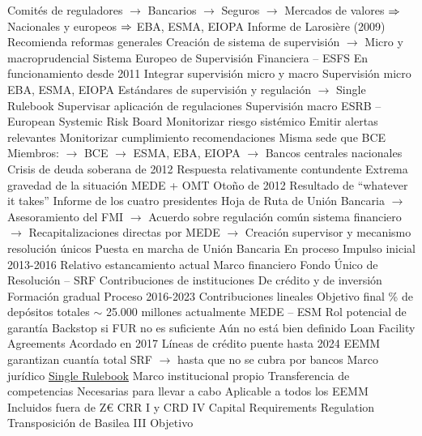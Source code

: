 \documentclass{nuevotema}
\begin{document}
\begin{esquemal}
				\4[] Comités de reguladores
				\4[] $\to$ Bancarios
				\4[] $\to$ Seguros
				\4[] $\to$ Mercados de valores
				\4[] $\Rightarrow$ Nacionales y europeos
				\4[] $\Rightarrow$ EBA, ESMA, EIOPA
			\3 Informe de Larosière (2009)
				\4 Recomienda reformas generales
				\4 Creación de sistema de supervisión
				\4[] $\to$ Micro y macroprudencial
			\3 Sistema Europeo de Supervisión Financiera -- ESFS
				\4 En funcionamiento desde 2011
				\4 Integrar supervisión micro y macro
				\4 Supervisión micro
				\4[] EBA, ESMA, EIOPA
				\4[] Estándares de supervisión y regulación
				\4[] $\to$ Single Rulebook
				\4[] Supervisar aplicación de regulaciones
				\4 Supervisión macro
				\4[] ESRB -- European Systemic Risk Board
				\4[] Monitorizar riesgo sistémico
				\4[] Emitir alertas relevantes
				\4[] Monitorizar cumplimiento recomendaciones
				\4[] Misma sede que BCE
				\4[] Miembros:
				\4[] $\to$ BCE
				\4[] $\to$ ESMA, EBA, EIOPA
				\4[] $\to$ Bancos centrales nacionales
			\3 Crisis de deuda soberana de 2012
				\4 Respuesta relativamente contundente
				\4[] Extrema gravedad de la situación
				\4 MEDE + OMT
				\4[] Otoño de 2012
				\4[] Resultado de ``whatever it takes''
				\4 Informe de los cuatro presidentes
				\4[] Hoja de Ruta de Unión Bancaria
				\4[] $\to$ Asesoramiento del FMI
				\4[] $\to$ Acuerdo sobre regulación común sistema financiero
				\4[] $\to$ Recapitalizaciones directas por MEDE
				\4[] $\to$ Creación supervisor y mecanismo resolución únicos
			\3 Puesta en marcha de Unión Bancaria
				\4 En proceso
				\4 Impulso inicial 2013-2016
				\4 Relativo estancamiento actual
		\2 Marco financiero
			\3 Fondo Único de Resolución -- SRF
				\4 Contribuciones de instituciones
				\4[] De crédito y de inversión
				\4 Formación gradual
				\4[] Proceso 2016-2023
				\4[] Contribuciones lineales
				\4 Objetivo final
				\% de depósitos totales
				\4[] $\sim$ 25.000 millones actualmente
			\3 MEDE -- ESM
				\4 Rol potencial de garantía
				\4[] Backstop si FUR no es suficiente
				\4[] Aún no está bien definido
			\3 Loan Facility Agreements
				\4 Acordado en 2017
				\4 Líneas de crédito puente hasta 2024
				\4[] EEMM garantizan cuantía total SRF
				\4[] $\to$ hasta que no se cubra por bancos
		\2 Marco jurídico
			\3 \underline{Single Rulebook}
				\4 Marco institucional propio
				\4 Transferencia de competencias
				\4[] Necesarias para llevar a cabo
				\4 Aplicable a todos los EEMM
				\4[] Incluidos fuera de Z€
			\3 CRR I y CRD IV
				\4 Capital Requirements Regulation
				\4 Transposición de Basilea III
				\4 Objetivo

\end{esquemal}
\end{document}
